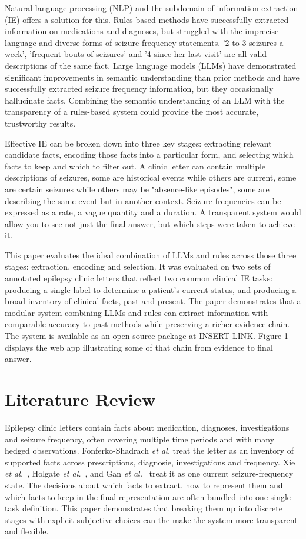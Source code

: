 \documentclass[conference]{IEEEtran}
\begin{document}
Natural language processing (NLP) and the subdomain
of information extraction (IE) offers a solution for this. 
Rules-based methods have successfully extracted
information on medications and diagnoses, but struggled
with the imprecise language and diverse forms
of seizure frequency statements. '2 to 3 seizures a week', 
'frequent bouts of seizures' and '4 since her last visit' are
all valid descriptions of the same fact. Large language 
models (LLMs) have demonstrated significant 
improvements in semantic understanding than prior 
methods and have successfully extracted seizure 
frequency information, but they occasionally hallucinate
facts. Combining the semantic understanding of an LLM
with the transparency of a rules-based system could
provide the most accurate, trustworthy results.

Effective IE can be broken down into three key stages: 
extracting relevant candidate facts, encoding those facts 
into a particular form, and selecting which facts to keep 
and which to filter out. A clinic letter can contain multiple 
descriptions of seizures, some are historical events while 
others are current, some are certain seizures while others 
may be "absence-like episodes", some are describing the 
same event but in another context. Seizure frequencies 
can be expressed as a rate, a vague quantity and a 
duration. A transparent system would allow you to see not 
just the final answer, but which steps were taken to achieve 
it.

This paper evaluates the ideal combination of LLMs and 
rules across those three stages: extraction, encoding and 
selection. It was evaluated on two sets of annotated 
epilepsy clinic letters that reflect two common clinical IE 
tasks: producing a single label to determine a patient's 
current status, and producing a broad inventory of clinical 
facts, past and present. The paper demonstrates that a 
modular system combining LLMs and rules can extract 
information with comparable accuracy to past methods 
while preserving a richer evidence chain. The system 
is available as an open source package at INSERT LINK.
Figure 1 displays the web app illustrating some of that 
chain from evidence to final answer.

\section{Literature Review}

Epilepsy clinic letters contain facts about medication, 
diagnoses, investigations and seizure frequency, often
covering multiple time periods and with many hedged\cite{b1}
observations. Fonferko-Shadrach \emph{et al.} treat the 
letter as an inventory of supported facts across prescriptions, 
diagnosie, investigations and frequency\cite{b1,b2}. 
Xie \emph{et al.}~\cite{b3}, Holgate \emph{et al.}~\cite{b4}, and 
Gan \emph{et al.}~\cite{b5} treat it as one current 
seizure-frequency state. The decisions about which facts
to extract, how to represent them and which facts to keep
in the final representation are often bundled into one 
single task definition. This paper demonstrates that 
breaking them up into discrete stages with explicit 
subjective choices can the make the system more 
transparent and flexible.
\end{document}
